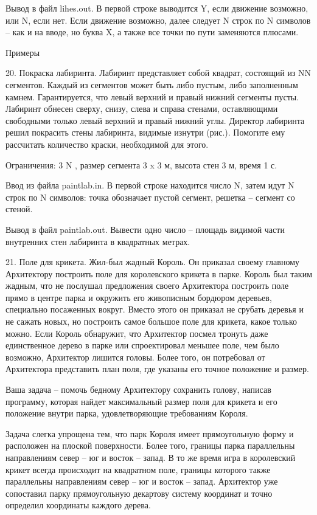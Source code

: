 \documentclass[]{article}
\begin{document}
Вывод в файл lihes.out. В первой строке выводится Y, если движение возможно, или N, если нет. Если движение возможно, далее следует N строк по N символов – как и на вводе, но буква X, а также все точки по пути заменяются плюсами.

Примеры



20. Покраска лабиринта. Лабиринт представляет собой квадрат, состоящий из N\times N сегментов. Каждый из сегментов может быть либо пустым, либо заполненным камнем. Гарантируется, что левый верхний и правый нижний сегменты пусты. Лабиринт обнесен сверху, снизу, слева и справа стенами, оставляющими свободными только левый верхний и правый нижний углы. Директор лабиринта решил покрасить стены лабиринта, видимые изнутри (рис.). Помогите ему рассчитать количество краски, необходимой для этого.

Ограничения: 3 \leq N , размер сегмента 3 x 3 м, высота стен 3 м, время 1 с.

Ввод из файла paintlab.in. В первой строке находится число N, затем идут N строк по N символов: точка обозначает пустой сегмент, решетка – сегмент со стеной.

Вывод в файл paintlab.out. Вывести одно число – площадь видимой части внутренних стен лабиринта в квадратных метрах.



21. Поле для крикета. Жил-был жадный Король. Он приказал своему главному Архитектору построить поле для королевского крикета в парке. Король был таким жадным, что не послушал предложения своего Архитектора построить поле прямо в центре парка и окружить его живописным бордюром деревьев, специально посаженных вокруг. Вместо этого он приказал не срубать деревья и не сажать новых, но построить самое большое поле для крикета, какое только можно. Если Король обнаружит, что Архитектор посмел тронуть даже единственное дерево в парке или спроектировал меньшее поле, чем было возможно, Архитектор лишится головы. Более того, он потребовал от Архитектора представить план поля, где указаны его точное положение и размер.

Ваша задача – помочь бедному Архитектору сохранить голову, написав программу, которая найдет максимальный размер поля для крикета и его положение внутри парка, удовлетворяющие требованиям Короля.



Задача слегка упрощена тем, что парк Короля имеет прямоугольную форму и расположен на плоской поверхности. Более того, границы парка параллельны направлениям север – юг и восток – запад. В то же время игра в королевский крикет всегда происходит на квадратном поле, границы которого также параллельны направлениям север – юг и восток – запад. Архитектор уже сопоставил парку прямоугольную декартову систему координат и точно определил координаты каждого дерева.
\end{document}
